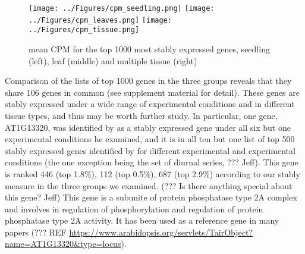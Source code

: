 \documentclass[11pt, a4paper]{article}
\begin{document}
\begin{figure}[] \begin{center}
    \texttt{[image: ../Figures/cpm\_seedling.png]}
    \texttt{[image: ../Figures/cpm\_leaves.png]}
    \texttt{[image: ../Figures/cpm\_tissue.png]}
    \caption{{\small{\label{cpm} mean CPM for the top 1000 most stably
    expressed genes, seedling (left), leaf (middle) and multiple tissue
    (right) }}} \end{center} 
\end{figure} 


Comparison of the lists of top 1000 genes in the three groups reveals that
they share 106 genes in common (see supplement material for detail).  These
genes are stably expressed under a wide range of experimental conditions
and in different tissue types, and thus may be worth further study.  In particular, one
gene, AT1G13320, was identified by \cite{hong2010identification} as a stably
expressed gene under all six but one experimental conditions he examined, and it is in
all ten but one list of top 500 stably expressed genes identified by
\cite{czechowski2005genome} for different experimental and experimental
conditions (the one exception being the set of diurnal series, ??? Jeff).
This gene is ranked 446 (top 1.8\%), 112 (top 0.5\%), 687 (top 2.9\%)
according to our stably measure in the three groups we examined.  (??? Is
there anything special about this gene? Jeff) This gene is a subunite of
protein phosphatase type 2A complex and involves in regulation of
phosphorylation and regulation of protein phosphatase type 2A activity. It has
been used as a reference gene in many papers (??? REF
\url{https://www.arabidopsis.org/servlets/TairObject?name=AT1G13320&type=locus}).  
\end{document}
